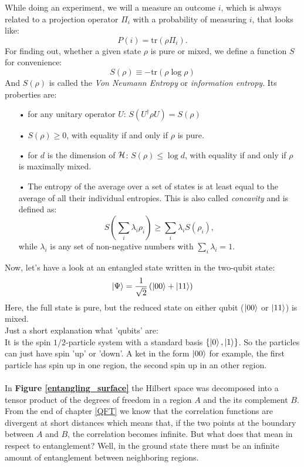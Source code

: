 	 While doing an experiment, we will a measure an outcome $i$, which is always related to a projection operator $\Pi_i$ with a probability of measuring $i$, that looks like: 
		 \begin{equation}
	 		P(i)=\mathrm{tr}(\rho\Pi_i).
	 	\end{equation}
	 For finding out, whether a given state $\rho$ is pure or mixed, we define a function $S$ for convenience:
		\begin{equation}
			S(\rho)\equiv -\mathrm{tr}(\rho \log \rho)
		\end{equation}	 	
	And $S(\rho)$ is called the \textit{Von Neumann Entropy} or \textit{information entropy}. 
	Its proberties are:
	\FloatBarrier
	\begin{itemize}
		\item[•] for any unitary operator $U$: $S(U^\dagger \rho U)=S(\rho)$
		\item[•] $S(\rho)\geq 0$, with equality if and only if $\rho$ is pure. 
		\item[•] for $d$ is the dimension of $\mathcal{H}$: $S(\rho)\leq \log d$, with equality if and only if $\rho$ is maximally mixed.
		\item[•] The entropy of the average over a set of states is at least equal to the average of all their individual entropies. This is also called \textit{concavity} and is defined as:
		\begin{equation}
			S \left(\sum_i \lambda_i \rho_i \right) \geq \sum_i \lambda_i S(\rho_i),
		\end{equation}
			while $\lambda_i$ is any set of non-negative numbers with $\sum_i \lambda_i =1$.
	\end{itemize}
	\FloatBarrier
	Now, let's have a look at an entangled state written in the two-qubit state:
		\begin{equation}
			|\Psi\rangle = \frac{1}{\sqrt{2}} \left(\ket{00} + \ket{11} \right)
		\end{equation}
	Here, the full state is pure, but the reduced state on either qubit ($\ket{00}$ or $\ket{11}$) is mixed. \\
	
	Just a short explanation what 'qubits' are: \\
	It is the spin $1/2$-particle system with a standard basis $\{\ket{0}, \ket{1}\}$. So the particles can just have spin 'up' or 'down'. A ket in the form $\ket{00}$ for example, the first particle has spin up in one region, the second spin up in an other region.
	\\ \\	
	In \textbf{Figure \ref{entangling_surface}} the Hilbert space was decomposed into a tensor product of the degrees of freedom in a region $A$ and the its complement $B$. From the end of chapter \ref{QFT} we know that the correlation functions are divergent at short distances which means that, if the two points at the boundary between $A$ and $B$, the correlation becomes infinite. But what does that mean in respect to entanglement? Well, in the ground state there must be an infinite amount of entanglement between neighboring regions. 
	
